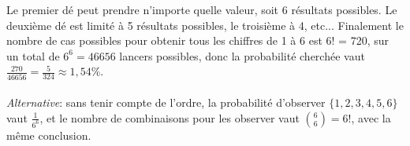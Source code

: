 Le premier d\'e peut prendre n'importe quelle valeur, soit 6 résultats possibles. Le deuxième d\'e est limité \`a 5 résultats possibles, le troisième \`a 4, etc... Finalement le nombre de cas possibles pour obtenir tous les chiffres de 1 \`a 6 est 6! = 720, sur un total de $6^6=46656$ lancers possibles, donc la probabilité cherchée vaut $\frac{270}{46656}=\frac{5}{324}\approx 1,54\%$.\\ \\
\textit{Alternative}: sans tenir compte de l'ordre, la probabilité d'observer $\{1,2,3,4,5,6\}$ vaut $\frac{1}{6^6}$, et le nombre de combinaisons pour les observer vaut $\binom{6}{6}=6!$, avec la même conclusion.
